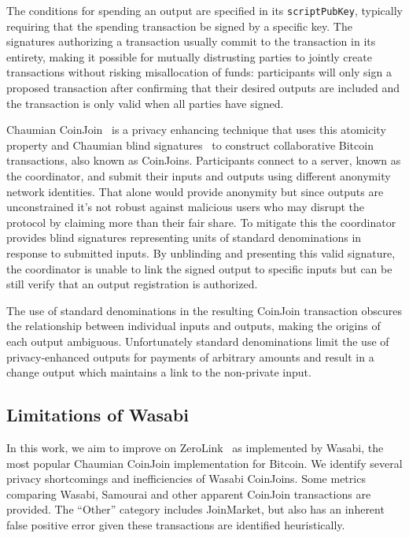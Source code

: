 \documentclass{article}
\begin{document}
The conditions for spending an output are specified in its \texttt{scriptPubKey}, typically requiring that the spending transaction be signed by a specific key. The signatures authorizing a transaction usually commit to the transaction in its entirety, making it possible for mutually distrusting parties to jointly create transactions without risking misallocation of funds: participants will only sign a proposed transaction after confirming that their desired outputs are included and the transaction is only valid when all parties have signed.

Chaumian CoinJoin~\cite{mizrahi2013blind,maxwell2013coinjoin,zerolink} is a privacy enhancing technique that uses this atomicity property and Chaumian blind signatures~\cite{chaum1983blind} to construct collaborative Bitcoin transactions, also known as CoinJoins. Participants connect to a server, known as the coordinator, and submit their inputs and outputs using different anonymity network identities. That alone would provide anonymity but since outputs are unconstrained it's not robust against malicious users who may disrupt the protocol by claiming more than their fair share. To mitigate this the coordinator provides blind signatures representing units of standard denominations in response to submitted inputs. By unblinding and presenting this valid signature, the coordinator is unable to link the signed output to specific inputs but can be still verify that an output registration is authorized.

The use of standard denominations in the resulting CoinJoin transaction obscures the relationship between individual inputs and outputs, making the origins of each output ambiguous. Unfortunately standard denominations limit the use of privacy-enhanced outputs for payments of arbitrary amounts and result in a change output which maintains a link to the non-private input.

\subsection{Limitations of Wasabi}
In this work, we aim to improve on ZeroLink~\cite{zerolink} as implemented by Wasabi, the most popular Chaumian CoinJoin implementation for Bitcoin. We identify several privacy shortcomings and inefficiencies of Wasabi CoinJoins. Some metrics comparing Wasabi, Samourai and other apparent CoinJoin transactions are provided. The ``Other'' category includes JoinMarket, but also has an inherent false positive error given these transactions are identified heuristically.
\end{document}
